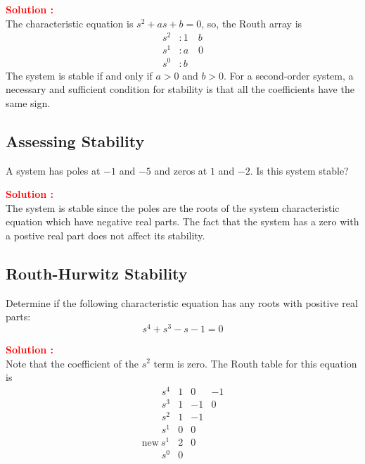 \documentclass[12pt]{article}
\begin{document}
\textbf{\textcolor{red}{Solution :}} \\
The characteristic equation is $s^2 + as + b = 0$, so, the Routh array is
\begin{align*}
    s^2 & : 1 \quad b \\
    s^1 & : a \quad 0 \\
    s^0 & : b
\end{align*}
The system is stable if and only if $a > 0$ and $b > 0$. For a second-order system, a necessary and sufficient condition for stability is that all the coefficients have the same sign.

\clearpage
\subsection{Assessing Stability}

A system has poles at \(-1\) and \(-5\) and zeros at \(1\) and \(-2\). Is this system stable?

\textbf{\textcolor{red}{Solution :}} \\
The system is stable since the poles are the roots of the system characteristic equation which have negative real parts. The fact that the system has a zero with a postive real part does not affect its stability.

\clearpage
\subsection{Routh-Hurwitz Stability}

Determine if the following characteristic equation has any roots with positive real parts:
\begin{equation}
    s^4+s^3-s-1 = 0
\end{equation}

\textbf{\textcolor{red}{Solution :}} \\
Note that the coefficient of the \(s^2\) term is zero. The Routh table for this equation is 
\[
\begin{array}{l|ccc}
\quad \quad s^4 & 1 & 0 & -1 \\
\quad \quad s^3 & 1 & -1 & 0 \\
\quad \quad s^2 & 1 & -1 & \\
\quad \quad s^1 & 0 & 0 & \\
\text{new} \ s^1 & 2 & 0 & \\
\quad \quad s^0 & 0 & & \\
\end{array}
\]
\end{document}
